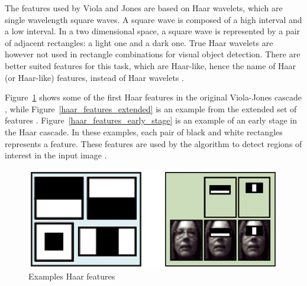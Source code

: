 \vspace{\baselineskip}
\noindent The features used by Viola and Jones are based on Haar wavelets, which are single wavelength square waves. A square wave is composed of a high interval and a low interval. In a two dimensional space, a square wave is represented by a pair of adjacent rectangles: a light one and a dark one. True Haar wavelets are however not used in rectangle combinations for visual object detection. There are better suited features for this task, which are Haar-like, hence the name of Haar (or Haar-like) features, instead of Haar wavelets \cite{HEW07}.
\newline

\noindent Figure~\ref{haar_features_first_2_stage} shows some of the first Haar features in the original Viola-Jones cascade \cite{HEW07}, while Figure~\ref{haar_features_extended} is an example from the extended set of features \cite{DIN08}. Figure~\ref{haar_features_early_stage} is an example of an early stage in the Haar cascade. In these examples, each pair of black and white rectangles represents a feature. These features are used by the algorithm to detect regions of interest in the input image \cite{HAR12}.
\newline

\begin{figure}[!h]
\begin{center}
\noindent \includegraphics[scale=0.9]{figures/haar_features_first_2_stage} 
\newline
\caption{Examples Haar features}
\label{haar_features_first_2_stage}
\end{center} 
\end{figure}

